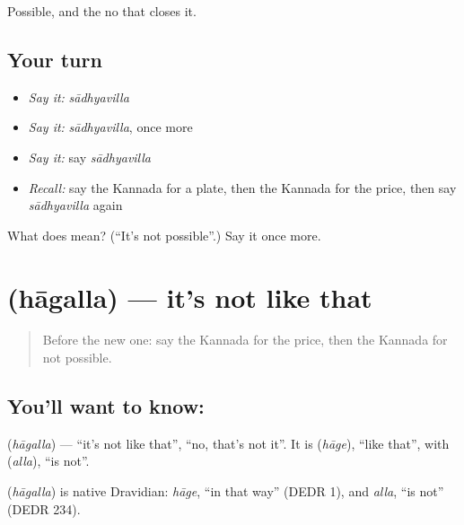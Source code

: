 \begin{grammarlens}[title={What you've built}]
Possible, and the no that closes it.
\end{grammarlens}

\subsection*{Your turn}
\begin{itemize}
\raggedright
  \item \emph{Say it:} \emph{sādhyavilla}
  \item \emph{Say it:} \emph{sādhyavilla}, once more
  \item \emph{Say it:} say \emph{sādhyavilla}
  \item \emph{Recall:} say the Kannada for a plate, then the Kannada for the price, then say \emph{sādhyavilla} again
\end{itemize}

\begin{tcolorbox}[breakable,colback=teal!4,colframe=teal!35!black,title={Before you move on}]
What does  mean? (\textquotedblleft{}It's not possible\textquotedblright{}.) Say it once more.
\end{tcolorbox}
\section[\texorpdfstring{\kn{ಹಾಗಲ್ಲ} (hāgalla)}{ಹಾಗಲ್ಲ (hāgalla)}]{ (hāgalla) — it's not like that}

\label{lesson:KA-C95-notlikethat}



\begin{quote}
Before the new one: say the Kannada for the price, then the Kannada for not possible.
\end{quote}

\subsection*{You'll want to know: }
\textbf{} (\emph{hāgalla}) — \textquotedblleft{}it's not like that\textquotedblright{}, \textquotedblleft{}no, that's not it\textquotedblright{}. It is \textbf{} (\emph{hāge}), \textquotedblleft{}like that\textquotedblright{}, with \textbf{} (\emph{alla}), \textquotedblleft{}is not\textquotedblright{}.

\begin{cousinweb}
\textbf{} (\emph{hāgalla}) is native Dravidian: \emph{hāge}, \textquotedblleft{}in that way\textquotedblright{} (DEDR 1), and \emph{alla}, \textquotedblleft{}is not\textquotedblright{} (DEDR 234).
\end{cousinweb}

